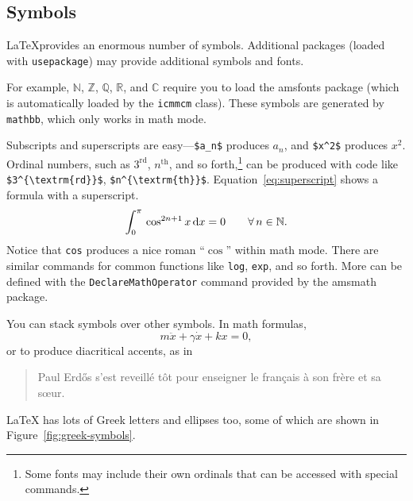 \documentclass{icmmcm}
\newcommand{\bslash}{\symbol{'134}}%
\newcommand{\bsl}{{\texttt{\bslash}}}
\newcommand{\com}[1]{\bsl\texttt{#1}\xspace}
\newcommand{\package}[1]{\textsf{#1}\xspace}
\begin{document}
{\subsection{Symbols}%
\label{sec:symbols}

\LaTeX provides an enormous number of symbols.  Additional packages
(loaded with \com{usepackage}) may provide additional symbols and
fonts.

For example, $\mathbb{N}$, $\mathbb{Z}$, $\mathbb{Q}$, $\mathbb{R}$,
and $\mathbb{C}$ require you to load the \package{amsfonts} package
(which is automatically loaded by the \texttt{icmmcm} class).  These
symbols are generated by \com{mathbb}, which only works in math mode.

Subscripts and superscripts are easy---\verb!$a_n$!  produces $a_n$,
and \verb!$x^2$! produces $x^2$.  Ordinal numbers, such as
$3^{\textrm{rd}}$, $n^{\textrm{th}}$, and so forth,\footnote{Some
  fonts may include their own ordinals that can be accessed with
  special commands.} can be produced with code like
\verb!$3^{\textrm{rd}}$!, \verb!$n^{\textrm{th}}$!.
Equation~\ref{eq:superscript} shows a formula with a superscript.
\begin{equation}
\label{eq:superscript}
 \int_{0}^{\pi} \, \cos^{2n+1} x \, {\rm d} x = 0 \qquad
\forall \, n \in \mathbb{N}. 
\end{equation}
Notice that \com{cos} produces a nice roman ``$\cos$'' within math
mode. There are similar commands for common functions like \com{log},
\com{exp}, and so forth.  More can be defined with the
\com{DeclareMathOperator} command provided by the \package{amsmath}
package.

You can stack symbols over other symbols. In math formulas,
\begin{equation}
  m\ddot{x} + \gamma\dot{x} + kx  = 0,
\end{equation}
or to produce diacritical accents, as in
\begin{quote}
  Paul Erd\H{o}s s'est reveill\'{e} t\^{o}t pour enseigner le
  fran\c{c}ais \`{a} son fr\`{e}re et sa s\oe{}ur.
\end{quote}

\LaTeX{} has lots of Greek letters and ellipses too, some of which are
shown in Figure~\ref{fig:greek-symbols}.

}
\end{document}
